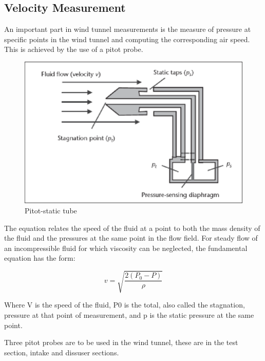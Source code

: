 \subsection{Velocity Measurement}
An important part in wind tunnel measurements is the measure of pressure at specific points in the wind tunnel and computing the corresponding air speed. This is achieved by the use of a pitot probe. 
\begin{center}
\begin{figure}
\centering
\includegraphics{Figures/pitot}
\caption[Pitot-static tube]{Pitot-static tube \cite{noauthor_wind_nodate}}
\end{figure}
\end{center}

The equation relates the speed of the fluid at a point to both the mass density of the fluid and the pressures at the same point in the flow field. For steady flow of an incompressible fluid for which viscosity can be neglected, the fundamental equation has the form:

$$ v = \sqrt{\frac{2(P_0 - P)}{\rho}}$$

Where V is the speed of the fluid, P0 is the total, also called the stagnation, pressure at that point of measurement, and p is the static pressure at the same point.

Three pitot probes are to be used in the wind tunnel, these are in the test section, intake and dissuser sections.

